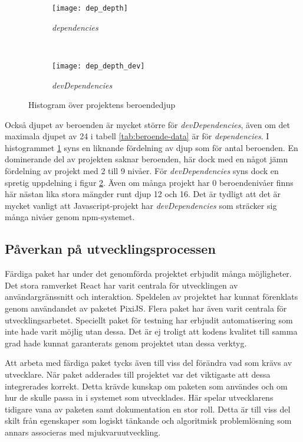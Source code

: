 \begin{figure*}
    \centering
    \begin{subfigure}[]{0.5\textwidth}
        \centering
        \texttt{[image: dep\_depth]}
        \caption{\textit{dependencies}}
        \label{fig:dep-depth-dependencies}
    \end{subfigure}%
    ~
    \begin{subfigure}[]{0.5\textwidth}
        \centering
        \texttt{[image: dep\_depth\_dev]}
        \caption{\textit{devDependencies}}
        \label{fig:dep-depth-devDependencies}
      \end{subfigure}
    \caption{Histogram över projektens beroendedjup}
    \label{fig:dep-depth}
\end{figure*}

Också djupet av beroenden är mycket större för \textit{devDependencies}, även om det maximala djupet av 24 i tabell \ref{tab:beroende-data} är för \textit{dependencies}. I histogrammet \ref{fig:dep-depth-dependencies} syns en liknande fördelning av djup som för antal beroenden. En dominerande del av projekten saknar beroenden, här dock med en något jämn fördelning av projekt med 2 till 9 nivåer. För \textit{devDependencies} syns dock en spretig uppdelning i figur \ref{fig:dep-depth-devDependencies}. Även om många projekt har 0 beroendenivåer finns här nästan lika stora mängder runt djup 12 och 16. Det är tydligt att det är mycket vanligt att Javascript-projekt har \textit{devDependencies} som sträcker sig många nivåer genom npm-systemet.

\subsection{Påverkan på utvecklingsprocessen}

Färdiga paket har under det genomförda projektet erbjudit många möjligheter. Det stora ramverket React har varit centrala för utvecklingen av användargränssnitt och interaktion. Speldelen av projektet har kunnat förenklats genom användandet av paketet PixiJS. Flera paket har även varit centrala för utvecklingsarbetet. Speciellt paket för testning har erbjudit automatisering som inte hade varit möjlig utan dessa. Det är ej troligt att kodens kvalitet till samma grad hade kunnat garanterats genom projektet utan dessa verktyg.

Att arbeta med färdiga paket tycks även till viss del förändra vad som krävs av utvecklare. När paket adderades till projektet var det viktigaste att dessa integrerades korrekt. Detta krävde kunskap om paketen som användes och om hur de skulle passa in i systemet som utvecklades. Här spelar utvecklarens tidigare vana av paketen samt dokumentation en stor roll. Detta är till viss del skilt från egenskaper som logiskt tänkande och algoritmisk problemlösning som annars associeras med mjukvaruutveckling.

